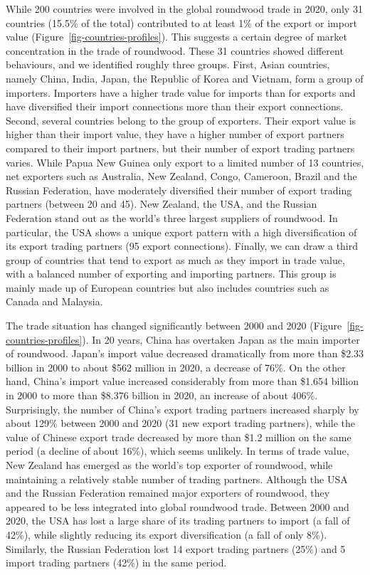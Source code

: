 \documentclass[
  authoryear,
  review,
  3p]{elsarticle}
\begin{document}
While 200 countries were involved in the global roundwood trade in 2020,
only 31 countries (15.5\% of the total) contributed to at least 1\% of
the export or import value (Figure~\ref{fig-countries-profiles}). This
suggests a certain degree of market concentration in the trade of
roundwood. These 31 countries showed different behaviours, and we
identified roughly three groups. First, Asian countries, namely China,
India, Japan, the Republic of Korea and Vietnam, form a group of
importers. Importers have a higher trade value for imports than for
exports and have diversified their import connections more than their
export connections. Second, several countries belong to the group of
exporters. Their export value is higher than their import value, they
have a higher number of export partners compared to their import
partners, but their number of export trading partners varies. While
Papua New Guinea only export to a limited number of 13 countries, net
exporters such as Australia, New Zealand, Congo, Cameroon, Brazil and
the Russian Federation, have moderately diversified their number of
export trading partners (between 20 and 45). New Zealand, the USA, and
the Russian Federation stand out as the world's three largest suppliers
of roundwood. In particular, the USA shows a unique export pattern with
a high diversification of its export trading partners (95 export
connections). Finally, we can draw a third group of countries that tend
to export as much as they import in trade value, with a balanced number
of exporting and importing partners. This group is mainly made up of
European countries but also includes countries such as Canada and
Malaysia.

The trade situation has changed significantly between 2000 and 2020
(Figure~\ref{fig-countries-profiles}). In 20 years, China has overtaken
Japan as the main importer of roundwood. Japan's import value decreased
dramatically from more than \$2.33 billion in 2000 to about \$562
million in 2020, a decrease of 76\%. On the other hand, China's import
value increased considerably from more than \$1.654 billion in 2000 to
more than \$8.376 billion in 2020, an increase of about 406\%.
Surprisingly, the number of China's export trading partners increased
sharply by about 129\% between 2000 and 2020 (31 new export trading
partners), while the value of Chinese export trade decreased by more
than \$1.2 million on the same period (a decline of about 16\%), which
seems unlikely. In terms of trade value, New Zealand has emerged as the
world's top exporter of roundwood, while maintaining a relatively stable
number of trading partners. Although the USA and the Russian Federation
remained major exporters of roundwood, they appeared to be less
integrated into global roundwood trade. Between 2000 and 2020, the USA
has lost a large share of its trading partners to import (a fall of
42\%), while slightly reducing its export diversification (a fall of
only 8\%). Similarly, the Russian Federation lost 14 export trading
partners (25\%) and 5 import trading partners (42\%) in the same period.
\end{document}
